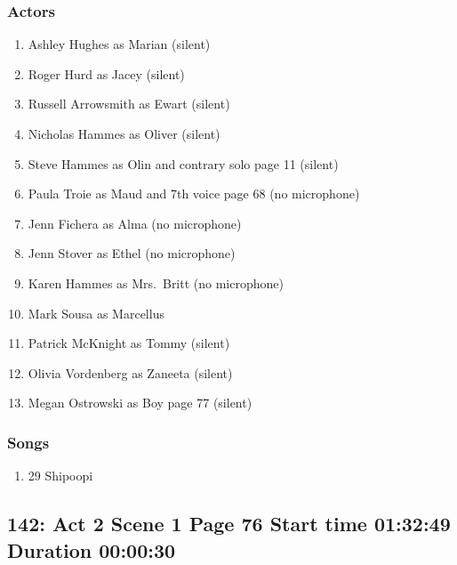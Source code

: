 \subsubsection{Actors}
\begin{enumerate}
\item Ashley Hughes as Marian (silent)
\item Roger Hurd as Jacey (silent)
\item Russell Arrowsmith as Ewart (silent)
\item Nicholas Hammes as Oliver (silent)
\item Steve Hammes as Olin and contrary solo page 11 (silent)
\item Paula Troie as Maud and 7th voice page 68 (no microphone)
\item Jenn Fichera as Alma (no microphone)
\item Jenn Stover as Ethel (no microphone)
\item Karen Hammes as Mrs.~Britt (no microphone)
\item Mark Sousa as Marcellus
\item Patrick McKnight as Tommy (silent)
\item Olivia Vordenberg as Zaneeta (silent)
\item Megan Ostrowski as Boy page 77 (silent)
\end{enumerate}

\subsubsection{Songs}
\begin{enumerate}
\item 29 Shipoopi
\end{enumerate}
\subsection{142: Act 2 Scene 1 Page 76 Start time 01:32:49 Duration 00:00:30}

